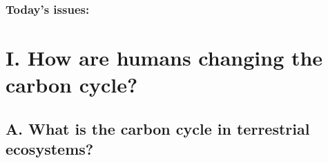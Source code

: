 %  

\begin{noheadline}
\begin{frame}
\frametitle{Today's issues:}
\tableofcontents
\end{frame}
\end{noheadline}

\section{I. How are humans changing the carbon cycle?}

\subsection{A. What is the carbon cycle in terrestrial ecosystems?}

